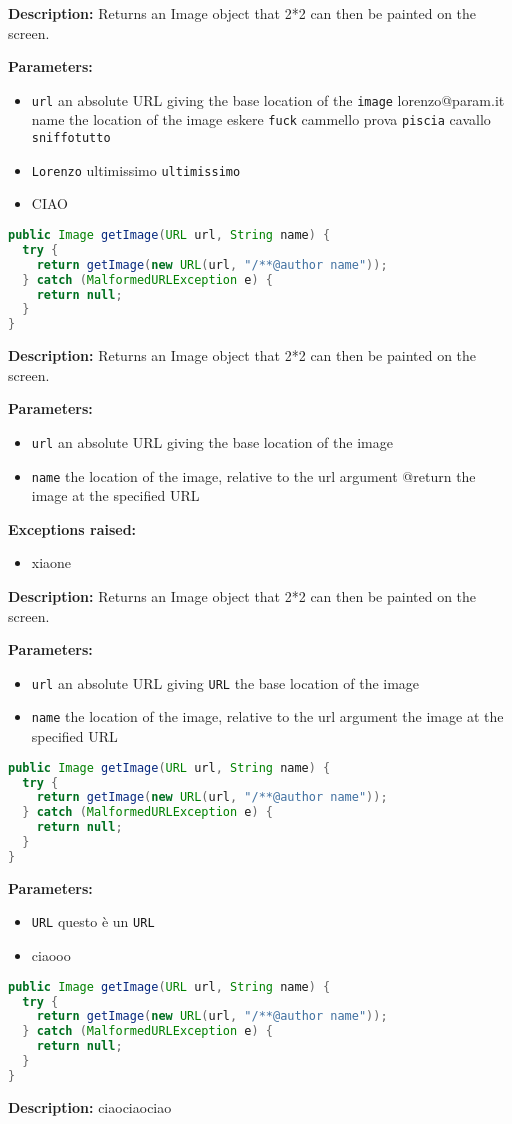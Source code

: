 \textbf{Description:}
Returns an Image object that 2*2 can then be painted on the screen.

\textbf{Parameters:}
\begin{itemize}
  \item\texttt{url}  an absolute URL giving the base location of the \texttt{image}  lorenzo@param.it  name the location of the image eskere \texttt{fuck}  cammello prova \texttt{piscia}  cavallo \texttt{sniffotutto}  
  \item\texttt{Lorenzo} ultimissimo \texttt{ultimissimo} 
  \item CIAO
\end{itemize}

\begin{lstlisting}[language=Java]
public Image getImage(URL url, String name) {
  try {
    return getImage(new URL(url, "/**@author name"));
  } catch (MalformedURLException e) {
    return null;
  }
}
\end{lstlisting}
\textbf{Description:}
Returns an Image object that 2*2 can then be painted on the screen.

\textbf{Parameters:}
\begin{itemize}
  \item\texttt{url}  an absolute URL giving the base location of the image 
  \item\texttt{name} the location of the image, relative to the url argument @return      the image at the specified URL 
\end{itemize}

\textbf{Exceptions raised:}
\begin{itemize}
  \item\texttt{} 
  \itemMammt xiaone
\end{itemize}

\textbf{Description:}
Returns an Image object that 2*2 can then be painted on the screen.

\textbf{Parameters:}
\begin{itemize}
  \item\texttt{url}  an absolute URL giving \texttt{URL}  the base location of the image 
  \item\texttt{name} the location of the image, relative to the url argument 
  \item@return      the image at the specified URL
\end{itemize}

\begin{lstlisting}[language=Java]
public Image getImage(URL url, String name) {
  try {
    return getImage(new URL(url, "/**@author name"));
  } catch (MalformedURLException e) {
    return null;
  }
}
\end{lstlisting}
\textbf{Parameters:}
\begin{itemize}
  \item\texttt{URL} questo è un \texttt{URL} 
  \item ciaooo
\end{itemize}

\begin{lstlisting}[language=Java]
public Image getImage(URL url, String name) {
  try {
    return getImage(new URL(url, "/**@author name"));
  } catch (MalformedURLException e) {
    return null;
  }
}
\end{lstlisting}
\textbf{Description:}
ciaociaociao


